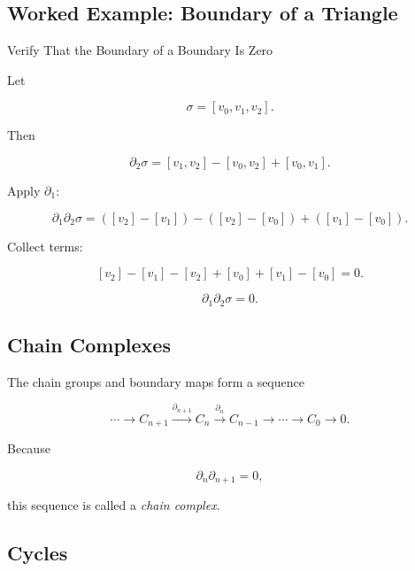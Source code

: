 \subsection{Worked Example: Boundary of a Triangle}
\label{subsec:worked-boundary-triangle}

\begin{workedexamplebox}{Verify That the Boundary of a Boundary Is Zero}

Let

\[
\sigma=[v_0,v_1,v_2].
\]

Then

\[
\partial_2\sigma
=
[v_1,v_2]
-
[v_0,v_2]
+
[v_0,v_1].
\]

Apply \(\partial_1\):

\[
\partial_1\partial_2\sigma
=
([v_2]-[v_1])
-
([v_2]-[v_0])
+
([v_1]-[v_0]).
\]

Collect terms:

\[
[v_2]-[v_1]-[v_2]+[v_0]+[v_1]-[v_0]
=
0.
\]

\begin{answerbox}
\[
\boxed{
\partial_1\partial_2\sigma=0.
}
\]
\end{answerbox}
\end{workedexamplebox}

\subsection{Chain Complexes}
\label{subsec:chain-complexes-topology}

The chain groups and boundary maps form a sequence

\[
\boxed{
\cdots
\longrightarrow
C_{n+1}
\xrightarrow{\partial_{n+1}}
C_n
\xrightarrow{\partial_n}
C_{n-1}
\longrightarrow
\cdots
\longrightarrow
C_0
\longrightarrow
0.
}
\]

Because

\[
\partial_n\partial_{n+1}=0,
\]

this sequence is called a \emph{chain complex}.

\subsection{Cycles}
\label{subsec:cycles}

